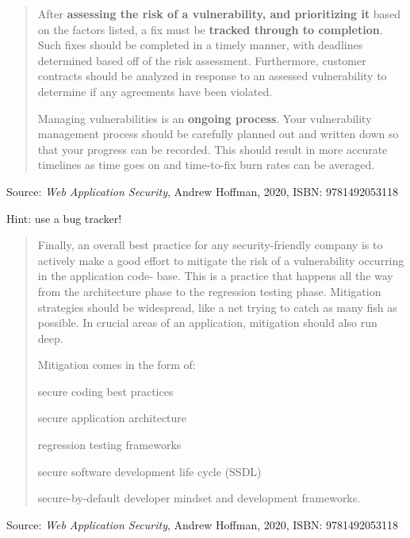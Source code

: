 \documentclass[Screen16to9,17pt]{foils}
\begin{document}
\begin{quote}
After {\bf assessing the risk of a vulnerability, and prioritizing it} based on the factors listed, a fix must be {\bf tracked through to completion}. Such fixes should be completed in a timely manner, with deadlines determined based off of the risk assessment. Furthermore, customer contracts should be analyzed in response to an assessed vulnerability to determine if any agreements have been violated.

Managing vulnerabilities is an {\bf ongoing process}. Your vulnerability management process should be carefully planned out and written down so that your progress can be recorded. This should result in more accurate timelines as time goes on and time-to-fix burn rates can be averaged.
\end{quote}
Source: \emph{Web Application Security}, Andrew Hoffman, 2020, ISBN: 9781492053118

\begin{list2}
\item Hint: use a bug tracker!
\end{list2}





\begin{quote}
Finally, an overall best practice for any security-friendly company is to actively make
a good effort to mitigate the risk of a vulnerability occurring in the application code‐
base. This is a practice that happens all the way from the architecture phase to the
regression testing phase.
Mitigation strategies should be widespread, like a net trying to catch as many fish as possible. In crucial areas of an application, mitigation should also run deep.

Mitigation comes in the form of:
\begin{list2}
\item secure coding best practices
\item secure application architecture
\item regression testing frameworks
\item secure software development life cycle (SSDL)
\item secure-by-default developer mindset and development frameworks.
\end{list2}
\end{quote}

Source: \emph{Web Application Security}, Andrew Hoffman, 2020, ISBN: 9781492053118
\end{document}
